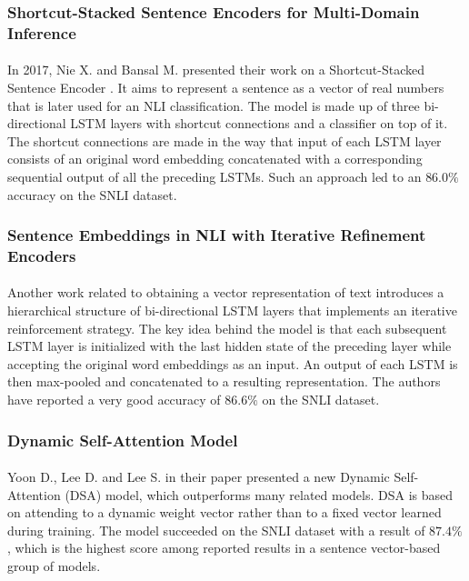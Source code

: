 \subsubsection{Shortcut-Stacked Sentence Encoders for Multi-Domain Inference}
\paragraph{}
In 2017, Nie X. and Bansal M. presented their work on a Shortcut-Stacked Sentence Encoder \cite{shortcut_stacked_sentence_encoders}. It aims to represent a sentence as a vector of real numbers that is later used for an NLI classification. The model is made up of three bi-directional LSTM layers with shortcut connections and a classifier on top of it. The shortcut connections are made in the way that input of each LSTM layer consists of an original word embedding concatenated with a corresponding sequential output of all the preceding LSTMs. Such an approach led to an $86.0\%$ accuracy on the SNLI dataset.

\subsubsection{Sentence Embeddings in NLI with Iterative Refinement Encoders}
\paragraph{}
Another work \cite{HBMP} related to obtaining a vector representation of text introduces a hierarchical structure of bi-directional LSTM layers that implements an iterative reinforcement strategy. The key idea behind the model is that each subsequent LSTM layer is initialized with the last hidden state of the preceding layer while accepting the original word embeddings as an input. An output of each LSTM is then max-pooled and concatenated to a resulting representation. The authors have reported a very good accuracy of $86.6\%$ on the SNLI dataset.


\subsubsection{Dynamic Self-Attention Model}
\paragraph{}
Yoon D., Lee D. and Lee S. in their paper \cite{DSA} presented a new Dynamic Self-Attention (DSA) model, which outperforms many related models. DSA is based on attending to a dynamic weight vector rather than to a fixed vector learned during training. The model succeeded on the SNLI dataset with a result of $87.4\%$, which is the highest score among reported results in a sentence vector-based group of models.

